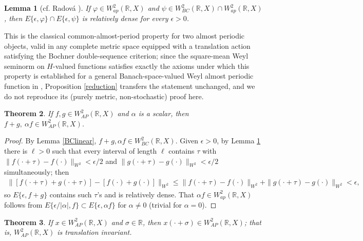 \documentclass[10pt,a4paper]{amsart}
\newtheorem{theorem}{Theorem}[section]
\newtheorem{lemma}[theorem]{Lemma}
\begin{document}
\begin{lemma}[cf. Radov\'a \cite{Radova}]\label{commonperiod}
If $\varphi\in W^2_{ap}(\mathbb R,X)$ and $\psi\in W^2_{BC}(\mathbb R,X)\cap W^2_{ap}(\mathbb R,X)$, then $E\{\epsilon,\varphi\}\cap E\{\epsilon,\psi\}$ is relatively dense for every $\epsilon>0$.
\end{lemma}

This is the classical common-almost-period property for two almost periodic objects, valid in any complete metric space equipped with a translation action satisfying the Bochner double-sequence criterion; since the square-mean Weyl seminorm on $H$-valued functions satisfies exactly the axioms under which this property is established for a general Banach-space-valued Weyl almost periodic function in \cite{LiWeyl}, Proposition \ref{reduction} transfers the statement unchanged, and we do not reproduce its (purely metric, non-stochastic) proof here.

\begin{theorem}\label{APlinear}
If $f,g\in W^2_{AP}(\mathbb R,X)$ and $\alpha$ is a scalar, then $f+g,\ \alpha f\in W^2_{AP}(\mathbb R,X)$.
\end{theorem}

\begin{proof}
By Lemma \ref{BClinear}, $f+g,\alpha f\in W^2_{BC}(\mathbb R,X)$. Given $\epsilon>0$, by Lemma \ref{commonperiod} there is $\ell>0$ such that every interval of length $\ell$ contains $\tau$ with $\|f(\cdot+\tau)-f(\cdot)\|_{W^2}<\epsilon/2$ and $\|g(\cdot+\tau)-g(\cdot)\|_{W^2}<\epsilon/2$ simultaneously; then
\begin{align*}
\|[f(\cdot+\tau)+g(\cdot+\tau)]-[f(\cdot)+g(\cdot)]\|_{W^2}\le\|f(\cdot+\tau)-f(\cdot)\|_{W^2}+\|g(\cdot+\tau)-g(\cdot)\|_{W^2}<\epsilon,
\end{align*}
so $E\{\epsilon,f+g\}$ contains such $\tau$'s and is relatively dense. That $\alpha f\in W^2_{ap}(\mathbb R,X)$ follows from $E\{\epsilon/|\alpha|,f\}\subset E\{\epsilon,\alpha f\}$ for $\alpha\ne0$ (trivial for $\alpha=0$).
\end{proof}

\begin{theorem}\label{APtrans}
If $x\in W^2_{AP}(\mathbb R,X)$ and $\sigma\in\mathbb R$, then $x(\cdot+\sigma)\in W^2_{AP}(\mathbb R,X)$; that is, $W^2_{AP}(\mathbb R,X)$ is translation invariant.
\end{theorem}
\end{document}
